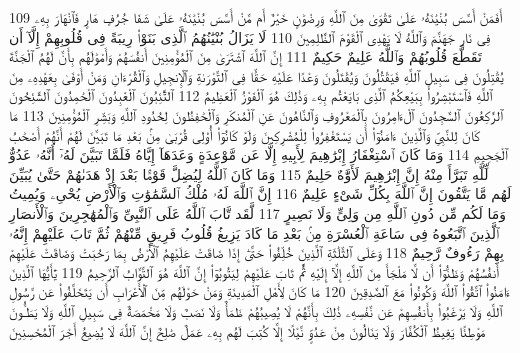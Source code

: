{\tiny\colorbox{cl_aya}{109}} أَفَمَنْ أَسَّسَ بُنْيَٰنَهُۥ عَلَىٰ تَقْوَىٰ مِنَ ٱللَّهِ وَرِضْوَٰنٍ خَيْرٌ أَم مَّنْ أَسَّسَ بُنْيَٰنَهُۥ عَلَىٰ شَفَا جُرُفٍ هَارٍ فَٱنْهَارَ بِهِۦ فِى نَارِ جَهَنَّمَ وَٱللَّهُ لَا يَهْدِى ٱلْقَوْمَ ٱلظَّٰلِمِينَ
{\tiny\colorbox{cl_aya}{110}} لَا يَزَالُ بُنْيَٰنُهُمُ ٱلَّذِى بَنَوْا۟ رِيبَةً فِى قُلُوبِهِمْ إِلَّآ أَن تَقَطَّعَ قُلُوبُهُمْ وَٱللَّهُ عَلِيمٌ حَكِيمٌ
{\tiny\colorbox{cl_aya}{111}} إِنَّ ٱللَّهَ ٱشْتَرَىٰ مِنَ ٱلْمُؤْمِنِينَ أَنفُسَهُمْ وَأَمْوَٰلَهُم بِأَنَّ لَهُمُ ٱلْجَنَّةَ يُقَٰتِلُونَ فِى سَبِيلِ ٱللَّهِ فَيَقْتُلُونَ وَيُقْتَلُونَ وَعْدًا عَلَيْهِ حَقًّا فِى ٱلتَّوْرَىٰةِ وَٱلْإِنجِيلِ وَٱلْقُرْءَانِ وَمَنْ أَوْفَىٰ بِعَهْدِهِۦ مِنَ ٱللَّهِ فَٱسْتَبْشِرُوا۟ بِبَيْعِكُمُ ٱلَّذِى بَايَعْتُم بِهِۦ وَذَٰلِكَ هُوَ ٱلْفَوْزُ ٱلْعَظِيمُ
{\tiny\colorbox{cl_aya}{112}} ٱلتَّٰٓئِبُونَ ٱلْعَٰبِدُونَ ٱلْحَٰمِدُونَ ٱلسَّٰٓئِحُونَ ٱلرَّٰكِعُونَ ٱلسَّٰجِدُونَ ٱلْءَامِرُونَ بِٱلْمَعْرُوفِ وَٱلنَّاهُونَ عَنِ ٱلْمُنكَرِ وَٱلْحَٰفِظُونَ لِحُدُودِ ٱللَّهِ وَبَشِّرِ ٱلْمُؤْمِنِينَ
{\tiny\colorbox{cl_aya}{113}} مَا كَانَ لِلنَّبِىِّ وَٱلَّذِينَ ءَامَنُوٓا۟ أَن يَسْتَغْفِرُوا۟ لِلْمُشْرِكِينَ وَلَوْ كَانُوٓا۟ أُو۟لِى قُرْبَىٰ مِنۢ بَعْدِ مَا تَبَيَّنَ لَهُمْ أَنَّهُمْ أَصْحَٰبُ ٱلْجَحِيمِ
{\tiny\colorbox{cl_aya}{114}} وَمَا كَانَ ٱسْتِغْفَارُ إِبْرَٰهِيمَ لِأَبِيهِ إِلَّا عَن مَّوْعِدَةٍ وَعَدَهَآ إِيَّاهُ فَلَمَّا تَبَيَّنَ لَهُۥٓ أَنَّهُۥ عَدُوٌّ لِّلَّهِ تَبَرَّأَ مِنْهُ إِنَّ إِبْرَٰهِيمَ لَأَوَّٰهٌ حَلِيمٌ
{\tiny\colorbox{cl_aya}{115}} وَمَا كَانَ ٱللَّهُ لِيُضِلَّ قَوْمًۢا بَعْدَ إِذْ هَدَىٰهُمْ حَتَّىٰ يُبَيِّنَ لَهُم مَّا يَتَّقُونَ إِنَّ ٱللَّهَ بِكُلِّ شَىْءٍ عَلِيمٌ
{\tiny\colorbox{cl_aya}{116}} إِنَّ ٱللَّهَ لَهُۥ مُلْكُ ٱلسَّمَٰوَٰتِ وَٱلْأَرْضِ يُحْىِۦ وَيُمِيتُ وَمَا لَكُم مِّن دُونِ ٱللَّهِ مِن وَلِىٍّ وَلَا نَصِيرٍ
{\tiny\colorbox{cl_aya}{117}} لَّقَد تَّابَ ٱللَّهُ عَلَى ٱلنَّبِىِّ وَٱلْمُهَٰجِرِينَ وَٱلْأَنصَارِ ٱلَّذِينَ ٱتَّبَعُوهُ فِى سَاعَةِ ٱلْعُسْرَةِ مِنۢ بَعْدِ مَا كَادَ يَزِيغُ قُلُوبُ فَرِيقٍ مِّنْهُمْ ثُمَّ تَابَ عَلَيْهِمْ إِنَّهُۥ بِهِمْ رَءُوفٌ رَّحِيمٌ
{\tiny\colorbox{cl_aya}{118}} وَعَلَى ٱلثَّلَٰثَةِ ٱلَّذِينَ خُلِّفُوا۟ حَتَّىٰٓ إِذَا ضَاقَتْ عَلَيْهِمُ ٱلْأَرْضُ بِمَا رَحُبَتْ وَضَاقَتْ عَلَيْهِمْ أَنفُسُهُمْ وَظَنُّوٓا۟ أَن لَّا مَلْجَأَ مِنَ ٱللَّهِ إِلَّآ إِلَيْهِ ثُمَّ تَابَ عَلَيْهِمْ لِيَتُوبُوٓا۟ إِنَّ ٱللَّهَ هُوَ ٱلتَّوَّابُ ٱلرَّحِيمُ
{\tiny\colorbox{cl_aya}{119}} يَٰٓأَيُّهَا ٱلَّذِينَ ءَامَنُوا۟ ٱتَّقُوا۟ ٱللَّهَ وَكُونُوا۟ مَعَ ٱلصَّٰدِقِينَ
{\tiny\colorbox{cl_aya}{120}} مَا كَانَ لِأَهْلِ ٱلْمَدِينَةِ وَمَنْ حَوْلَهُم مِّنَ ٱلْأَعْرَابِ أَن يَتَخَلَّفُوا۟ عَن رَّسُولِ ٱللَّهِ وَلَا يَرْغَبُوا۟ بِأَنفُسِهِمْ عَن نَّفْسِهِۦ ذَٰلِكَ بِأَنَّهُمْ لَا يُصِيبُهُمْ ظَمَأٌ وَلَا نَصَبٌ وَلَا مَخْمَصَةٌ فِى سَبِيلِ ٱللَّهِ وَلَا يَطَـُٔونَ مَوْطِئًا يَغِيظُ ٱلْكُفَّارَ وَلَا يَنَالُونَ مِنْ عَدُوٍّ نَّيْلًا إِلَّا كُتِبَ لَهُم بِهِۦ عَمَلٌ صَٰلِحٌ إِنَّ ٱللَّهَ لَا يُضِيعُ أَجْرَ ٱلْمُحْسِنِينَ
